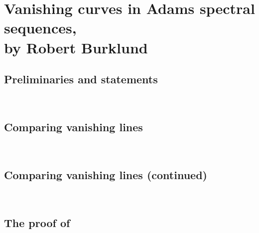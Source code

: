 \documentclass[reqno]{amsart}
\begin{document}


\section{Vanishing curves in Adams spectral sequences, \texorpdfstring{\\}{} by Robert Burklund} \label{sec:Appendix}



\subsection{Preliminaries and statements}
\label{app:prelim}\ 



\subsection{Comparing vanishing lines}
\label{app:ABvl}\ 



\subsection{Comparing vanishing lines (continued)}
\label{app:blocks}\ 



\subsection{The proof of }
\label{app:reductions}\ 






\end{document}
